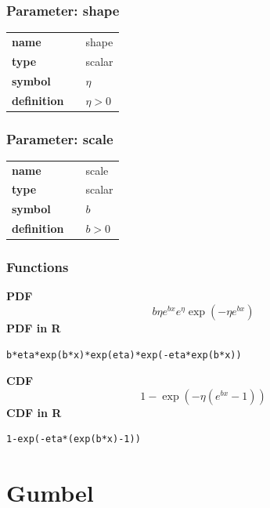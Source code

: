 \documentclass{article}
\begin{document}
\subsubsection*{Parameter: shape}

\noindent\begin{tabular}{p{2cm}cl}
\textbf{name} & & shape \\
\textbf{type} & & scalar \\
\textbf{symbol} & & $\eta$  \\
\textbf{definition} & & $\eta > 0$
\end{tabular}
\subsubsection*{Parameter: scale}

\noindent\begin{tabular}{p{2cm}cl}
\textbf{name} & & scale \\
\textbf{type} & & scalar \\
\textbf{symbol} & & $b$  \\
\textbf{definition} & & $b > 0$
\end{tabular}
\subsubsection*{Functions}

\smallskip \noindent \hspace{.2cm} \textbf{PDF} 
\begin{equation*}b\eta e^{bx}e^{\eta}\exp\left(-\eta e^{bx} \right)\end{equation*}
\smallskip \noindent \hspace{.2cm} \textbf{PDF in R}  
\begin{verbatim}b*eta*exp(b*x)*exp(eta)*exp(-eta*exp(b*x))\end{verbatim}
\smallskip \noindent \hspace{.2cm} \textbf{CDF} 
\begin{equation*}1-\exp\left(-\eta\left(e^{bx}-1 \right)\right)\end{equation*}
\smallskip \noindent \hspace{.2cm} \textbf{CDF in R} 
\begin{verbatim}1-exp(-eta*(exp(b*x)-1))\end{verbatim}
\smallskip\section*{Gumbel} 
\end{document}
